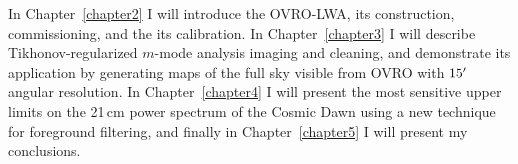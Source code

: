 \begin{bibunit}
In Chapter~\ref{chapter2} I will introduce the OVRO-LWA, its construction, commissioning, and the
its calibration. In Chapter~\ref{chapter3} I will describe Tikhonov-regularized $m$-mode analysis
imaging and cleaning, and demonstrate its application by generating maps of the full sky visible
from OVRO with $15\mbox{$^\prime$}$ angular resolution. In Chapter~\ref{chapter4} I will present the most
sensitive upper limits on the 21\,cm power spectrum of the Cosmic Dawn using a new technique for
foreground filtering, and finally in Chapter~\ref{chapter5} I will present my conclusions.

\end{bibunit}

